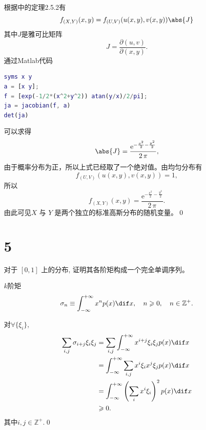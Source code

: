 \documentclass[12pt,a4]{ctexart}
\begin{document}
根据\cite[P91]{THU-stat}中的定理2.5.2有
\begin{equation}
	f_{(X,Y)}(x,y) =f_{(U,V)} (u(x,y),v(x,y)) \abs{J}
\end{equation}
其中$J$是雅可比矩阵
\begin{equation}
	J = \frac{\partial (u,v)}{\partial (x,y)}.
\end{equation}
通过{Matlab}代码
\begin{lstlisting}[language=matlab]
syms x y
a = [x y];
f = [exp(-1/2*(x^2+y^2)) atan(y/x)/2/pi];
ja = jacobian(f, a)
det(ja)	
\end{lstlisting}
可以求得
\begin{equation}
	\abs{J} = \frac{{\mathrm{e}}^{-\frac{x^2 }{2}-\frac{y^2 }{2}} }{2\,\pi },
\end{equation}
由于概率分布为正，所以上式已经取了一个绝对值。由均匀分布有
\begin{equation}
	f_{(U,V)} (u(x,y),v(x,y)) = 1,
\end{equation}
所以
\begin{equation}
	f_{(X,Y)}(x,y) = \frac{{\mathrm{e}}^{-\frac{x^2 }{2}-\frac{y^2 }{2}} }{2\,\pi }.
\end{equation}
由此可见$X$ 与 $Y$ 是两个独立的标准高斯分布的随机变量。\qed


\section{5}

对于 $[0,1]$ 上的分布, 证明其各阶矩构成一个完全单调序列。

$k$阶矩
\begin{equation}
	\sigma_n \equiv \int^{+\infty}_{-\infty} x^n p(x) \dif x,\quad n \geqslant 0, \quad n \in \mathbb{Z}^+.
\end{equation}

对$\forall \{ \xi_i \}$,
\begin{equation}
	\begin{aligned}
		\sum_{i,j} \sigma_{i+j}
		\xi_i \xi_j & = \sum_{i,j} \int^{+\infty}_{-\infty} x^{i+j} \xi_i \xi_j p(x) \dif x         \\
		            & = \int^{+\infty}_{-\infty} \sum_{i,j} x^{i} \xi_i x^j \xi_j p(x) \dif x       \\
		            & = \int^{+\infty}_{-\infty}  \left( \sum_{i} x^{i} \xi_i \right)^2 p(x) \dif x \\
		            & \geqslant 0.
	\end{aligned}
\end{equation}
其中$i,j\in \mathbb{Z}^+$.\qed
\end{document}
